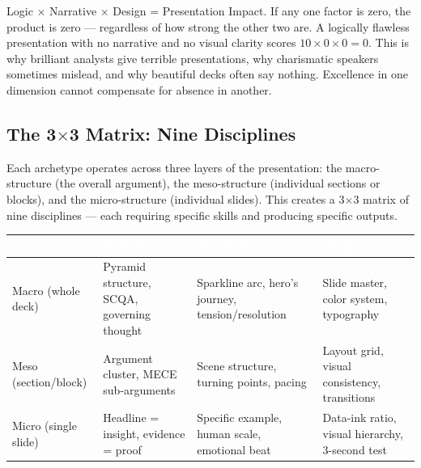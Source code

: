 \begin{insightbox}
Logic $\times$ Narrative $\times$ Design = Presentation Impact. If any one factor is zero, the product is zero --- regardless of how strong the other two are. A logically flawless presentation with no narrative and no visual clarity scores $10 \times 0 \times 0 = 0$. This is why brilliant analysts give terrible presentations, why charismatic speakers sometimes mislead, and why beautiful decks often say nothing. Excellence in one dimension cannot compensate for absence in another.
\end{insightbox}

\subsection{The 3$\times$3 Matrix: Nine Disciplines}


Each archetype operates across three layers of the presentation: the macro-structure (the overall argument), the meso-structure (individual sections or blocks), and the micro-structure (individual slides). This creates a 3$\times$3 matrix of nine disciplines --- each requiring specific skills and producing specific outputs.

\begin{center}
\begin{tabularx}{\textwidth}{>{\raggedright}p{2.5cm} >{\raggedright}p{4cm} >{\raggedright}p{4cm} >{\raggedright\arraybackslash}p{3cm}}
\toprule
\rowcolor{tableheader} \textcolor{white}{\textbf{Layer}} & \textcolor{white}{\textbf{Architect}} & \textcolor{white}{\textbf{Storyteller}} & \textcolor{white}{\textbf{Designer}} \\
\midrule
Macro (whole deck) & Pyramid structure, SCQA, governing thought & Sparkline arc, hero's journey, tension/resolution & Slide master, color system, typography \\
\rowcolor{altrow}
Meso (section/block) & Argument cluster, MECE sub-arguments & Scene structure, turning points, pacing & Layout grid, visual consistency, transitions \\
Micro (single slide) & Headline = insight, evidence = proof & Specific example, human scale, emotional beat & Data-ink ratio, visual hierarchy, 3-second test \\
\bottomrule
\end{tabularx}
\end{center}

